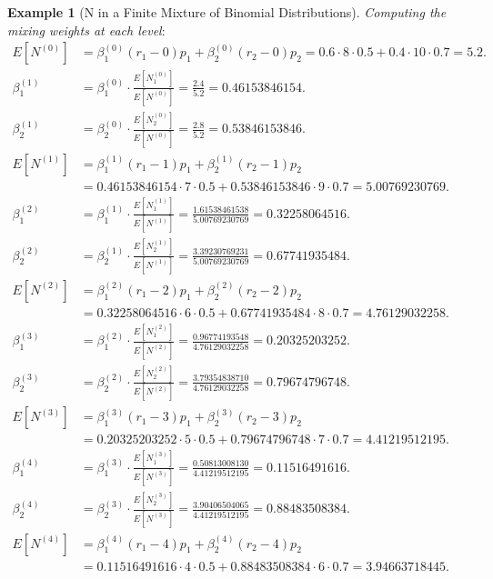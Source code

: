 \documentclass[11pt]{amsart}
\theoremstyle{definition}
\newtheorem{example}{Example}
\theoremstyle{plain}
\begin{document}
\begin{example}[N in a Finite Mixture of Binomial Distributions]
\noindent\textit{Computing the mixing weights at each level}:
\begin{align*}
E[N^{(0)}]
    &= \beta_1^{(0)}(r_1 - 0)p_1 + \beta_2^{(0)}(r_2 - 0)p_2
     = 0.6 \cdot 8 \cdot 0.5 + 0.4 \cdot 10 \cdot 0.7
     = 5.2. \\
\beta_1^{(1)} &= \beta_1^{(0)} \cdot \frac{E[N_1^{(0)}]}{E[N^{(0)}]}
    = \frac{2.4}{5.2} = 0.46153846154. \\
\beta_2^{(1)} &= \beta_2^{(0)} \cdot \frac{E[N_2^{(0)}]}{E[N^{(0)}]}
    = \frac{2.8}{5.2} = 0.53846153846. \\
E[N^{(1)}]
    &= \beta_1^{(1)}(r_1 - 1)p_1 + \beta_2^{(1)}(r_2 - 1)p_2 \\
    &= 0.46153846154 \cdot 7 \cdot 0.5 + 0.53846153846 \cdot 9 \cdot 0.7
     = 5.00769230769. \\
\beta_1^{(2)} &= \beta_1^{(1)} \cdot \frac{E[N_1^{(1)}]}{E[N^{(1)}]}
    = \frac{1.61538461538}{5.00769230769} = 0.32258064516. \\
\beta_2^{(2)} &= \beta_2^{(1)} \cdot \frac{E[N_2^{(1)}]}{E[N^{(1)}]}
    = \frac{3.39230769231}{5.00769230769} = 0.67741935484. \\
E[N^{(2)}]
    &= \beta_1^{(2)}(r_1 - 2)p_1 + \beta_2^{(2)}(r_2 - 2)p_2 \\
    &= 0.32258064516 \cdot 6 \cdot 0.5 + 0.67741935484 \cdot 8 \cdot 0.7
     = 4.76129032258. \\
\beta_1^{(3)} &= \beta_1^{(2)} \cdot \frac{E[N_1^{(2)}]}{E[N^{(2)}]}
    = \frac{0.96774193548}{4.76129032258} = 0.20325203252. \\
\beta_2^{(3)} &= \beta_2^{(2)} \cdot \frac{E[N_2^{(2)}]}{E[N^{(2)}]}
    = \frac{3.79354838710}{4.76129032258} = 0.79674796748. \\
E[N^{(3)}]
    &= \beta_1^{(3)}(r_1 - 3)p_1 + \beta_2^{(3)}(r_2 - 3)p_2 \\
    &= 0.20325203252 \cdot 5 \cdot 0.5 + 0.79674796748 \cdot 7 \cdot 0.7
     = 4.41219512195. \\
\beta_1^{(4)} &= \beta_1^{(3)} \cdot \frac{E[N_1^{(3)}]}{E[N^{(3)}]}
    = \frac{0.50813008130}{4.41219512195} = 0.11516491616. \\
\beta_2^{(4)} &= \beta_2^{(3)} \cdot \frac{E[N_2^{(3)}]}{E[N^{(3)}]}
    = \frac{3.90406504065}{4.41219512195} = 0.88483508384. \\
E[N^{(4)}]
    &= \beta_1^{(4)}(r_1 - 4)p_1 + \beta_2^{(4)}(r_2 - 4)p_2 \\
    &= 0.11516491616 \cdot 4 \cdot 0.5 + 0.88483508384 \cdot 6 \cdot 0.7
     = 3.94663718445.
\end{align*}


\end{example}
\end{document}
